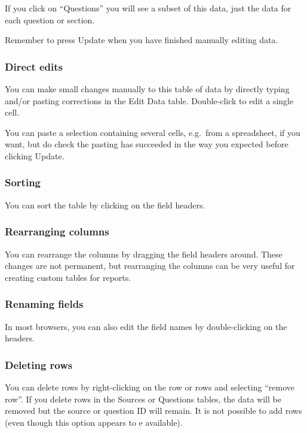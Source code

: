 \documentclass[
]{book}
\begin{document}
If you click on ``Questions'' you will see a subset of this data, just the data for each question or section.

Remember to press Update when you have finished manually editing data.

\hypertarget{direct-edits}{%
\subsubsection{Direct edits}\label{direct-edits}}

You can make small changes manually to this table of data by directly typing and/or pasting corrections in the Edit Data table. Double-click to edit a single cell.

You can paste a selection containing several cells, e.g.~from a spreadsheet, if you want, but do check the pasting has succeeded in the way you expected before clicking Update.

\hypertarget{sorting-1}{%
\subsubsection{Sorting}\label{sorting-1}}

You can sort the table by clicking on the field headers.

\hypertarget{rearranging-columns}{%
\subsubsection{Rearranging columns}\label{rearranging-columns}}

You can rearrange the columns by dragging the field headers around. These changes are not permanent, but rearranging the columns can be very useful for creating custom tables for reports.

\hypertarget{renaming-fields}{%
\subsubsection{Renaming fields}\label{renaming-fields}}

In most browsers, you can also edit the field names by double-clicking on the headers.

\hypertarget{deleting-rows}{%
\subsubsection{Deleting rows}\label{deleting-rows}}

You can delete rows by right-clicking on the row or rows and selecting ``remove row''. If you delete rows in the Sources or Questions tables, the data will be removed but the source or question ID will remain. It is not possible to add rows (even though this option appears to e available).
\end{document}
